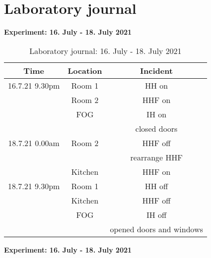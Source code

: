\section{Laboratory journal}
\label{sec:appendix:Laborbuch}
\textbf{Experiment: 16. July - 18. July 2021}
\begin{table}[H]
    \centering
    \begin{tabular}{c|c|c}
        \textbf{Time} & \textbf{Location} & \textbf{Incident }\\
        \hline
        \hline
        16.7.21 9.30pm & Room 1 & HH on\\
        & Room 2 & HHF on\\
        & FOG & IH on\\
        && closed doors\\
        \hline
        18.7.21 0.00am & Room 2 & HHF off\\ 
        && rearrange HHF \\
        & Kitchen & HHF on\\
        \hline
        18.7.21 9.30pm & Room 1 & HH off\\
        & Kitchen & HHF off\\
        & FOG & IH off\\
        && opened doors and windows\\
    \end{tabular}
    \caption{Laboratory journal: 16. July - 18. July 2021}
    \label{tab:Experiment1}
\end{table}
\textbf{Experiment: 16. July - 18. July 2021}
